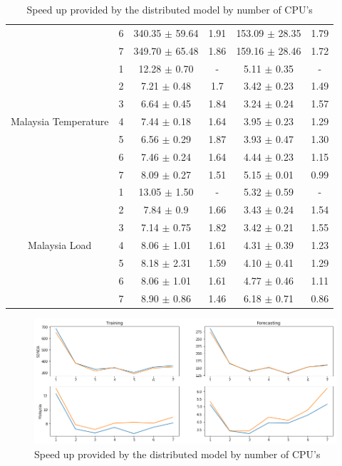 \begin{table}[ht]
{\begin{tabular}{|c|c|c|c|c|c|}
             & 6 & 340.35 $\pm$ 59.64 & 1.91 & 153.09 $\pm$ 28.35 & 1.79 \\ \cline{2-6}
             & 7 & 349.70 $\pm$ 65.48 & 1.86 & 159.16 $\pm$ 28.46 & 1.72 \\ \hline
        \multirow{7}{*}{Malaysia Temperature }
             & 1 & 12.28 $\pm$ 0.70 & - & 5.11 $\pm$ 0.35 & - \\ \cline{2-6}
             & 2 & 7.21 $\pm$ 0.48 & 1.7 & 3.42 $\pm$ 0.23 & 1.49 \\ \cline{2-6}
             & 3 & 6.64 $\pm$ 0.45 & 1.84 & 3.24 $\pm$ 0.24 & 1.57 \\ \cline{2-6}
             & 4 & 7.44 $\pm$ 0.18 & 1.64 & 3.95 $\pm$ 0.23 & 1.29 \\ \cline{2-6}
             & 5 & 6.56 $\pm$ 0.29 & 1.87 & 3.93 $\pm$ 0.47 & 1.30 \\ \cline{2-6}
             & 6 & 7.46 $\pm$ 0.24 & 1.64 & 4.44 $\pm$ 0.23 & 1.15 \\ \cline{2-6}
             & 7 & 8.09 $\pm$ 0.27 & 1.51 & 5.15 $\pm$ 0.01 & 0.99 \\ \hline
        \multirow{7}{*}{Malaysia Load }
             & 1 & 13.05 $\pm$ 1.50 & - & 5.32 $\pm$ 0.59 & - \\ \cline{2-6}
             & 2 & 7.84 $\pm$ 0.9 & 1.66 & 3.43 $\pm$ 0.24 & 1.54 \\ \cline{2-6}
             & 3 & 7.14 $\pm$ 0.75 & 1.82 & 3.42 $\pm$ 0.21 & 1.55 \\ \cline{2-6}
             & 4 & 8.06 $\pm$ 1.01 & 1.61 & 4.31 $\pm$ 0.39 & 1.23 \\ \cline{2-6}
             & 5 & 8.18 $\pm$ 2.31 & 1.59 & 4.10 $\pm$ 0.41 & 1.29 \\ \cline{2-6}
             & 6 & 8.06 $\pm$ 1.01 & 1.61 & 4.77 $\pm$ 0.46 & 1.11 \\ \cline{2-6}
             & 7 & 8.90 $\pm$ 0.86 & 1.46 & 6.18 $\pm$ 0.71 & 0.86 \\ \hline
    \end{tabular}
    }
    \caption{Speed up provided by the distributed model by number of CPU's}
    \label{tab:speed_up}
\end{table}

\begin{figure}
    \centering
    \includegraphics[width=\textwidth]{figures/speed_up.png}
    \caption{Speed up provided by the distributed model by number of CPU's}
    \label{fig:speed_up}
\end{figure}


